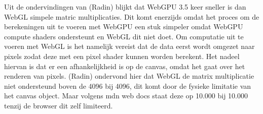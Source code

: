 Uit de ondervindingen van (Radin) blijkt dat WebGPU 3.5 keer sneller is dan WebGL simpele matric multiplicaties. Dit komt enerzijds omdat het proces om de berekeningen uit te voeren met WebGPU een stuk simpeler omdat WebGPU compute shaders ondersteunt en WebGL dit niet doet. Om computatie uit te voeren met WebGL is het namelijk vereist dat de data eerst wordt omgezet naar pixels zodat deze met een pixel shader kunnen worden berekent. Het nadeel hiervan is dat er een afhankelijkheid is op de canvas, omdat het gaat over het renderen van pixels. (Radin) ondervond hier dat WebGL de matrix multiplicatie niet ondersteund boven de 4096 bij 4096, dit komt door de fysieke limitatie van het canvas object. Maar volgens mdn web docs staat deze op 10.000 bij 10.000 tenzij de browser dit zelf limiteerd.
